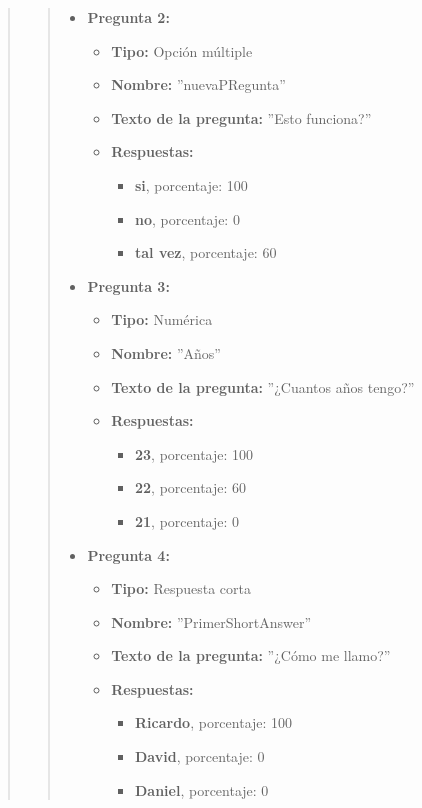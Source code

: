\begin{quote}
\begin{quote}
\begin{itemize}
                \item \textbf{Pregunta 2:}
                \begin{itemize}
                  \item \textbf{Tipo:} Opción múltiple
                  \item \textbf{Nombre:} ''nuevaPRegunta''
                  \item \textbf{Texto de la pregunta:} ''Esto funciona?''
                  \item \textbf{Respuestas:}
                  \begin{itemize}
                    \item \textbf{si}, porcentaje: 100
                    \item \textbf{no}, porcentaje: 0
                    \item \textbf{tal vez}, porcentaje: 60
                  \end{itemize}
                \end{itemize}

                \item \textbf{Pregunta 3:}
                \begin{itemize}
                  \item \textbf{Tipo:} Numérica
                  \item \textbf{Nombre:} ''Años''
                  \item \textbf{Texto de la pregunta:} ''¿Cuantos años tengo?''
                  \item \textbf{Respuestas:}
                  \begin{itemize}
                    \item \textbf{23}, porcentaje: 100
                    \item \textbf{22}, porcentaje: 60
                    \item \textbf{21}, porcentaje: 0
                  \end{itemize}
                \end{itemize}

                \item \textbf{Pregunta 4:}
                \begin{itemize}
                  \item \textbf{Tipo:} Respuesta corta
                  \item \textbf{Nombre:} ''PrimerShortAnswer''
                  \item \textbf{Texto de la pregunta:} ''¿Cómo me llamo?''
                  \item \textbf{Respuestas:}
                  \begin{itemize}
                    \item \textbf{Ricardo}, porcentaje: 100
                    \item \textbf{David}, porcentaje: 0
                    \item \textbf{Daniel}, porcentaje: 0
                  \end{itemize}
                \end{itemize}


\end{itemize}
\end{quote}
\end{quote}
